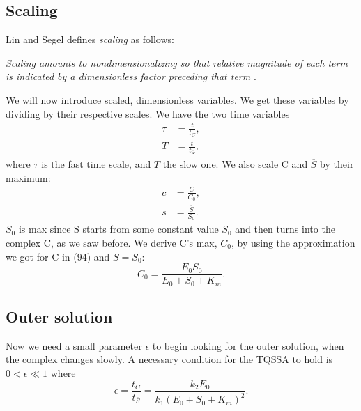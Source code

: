 \documentclass[12pt]{article}
\begin{document}
\subsection{Scaling}

Lin and Segel defines \textit{scaling} as follows:

\textit{Scaling amounts to nondimensionalizing so that relative magnitude of
each term is indicated by a dimensionless factor preceding that term}
\cite{lin1974mathematics}.

We will now introduce scaled, dimensionless variables. We get these
variables by dividing by their respective scales. We have the two time
variables
\begin{align}
\tau &= \frac{t}{t_C}, \\
T &= \frac{t}{t_{\overline{S}}},
\end{align}
where $\tau$ is the fast time scale, and $T$ the slow one. We also
scale C and $\overline{S}$ by their maximum:
\begin{align}
c &= \frac{C}{C_0}, \\
s &= \frac{\overline{S}}{S_0}.
\end{align}
$S_0$ is max since S starts from some constant value $S_0$ and then
turns into the complex C, as we saw before. We derive C's max, $C_0$,
by using the approximation we got for C in (94) and $S=S_0$:
\begin{equation}
C_0 = \frac{E_0 S_0}{E_0 + S_0 + K_m}.
\end{equation}

\subsection{Outer solution}

Now we need a small parameter $\epsilon$ to begin looking for the
outer solution, when the complex changes slowly. A necessary condition
for the TQSSA to hold is $0 < \epsilon \ll 1$ where
\begin{equation}
\epsilon = \frac{t_C}{t_{\overline{S}}} = \frac{k_2 E_0}{k_1(E_0+S_0+K_m)^2}.
\end{equation}
\end{document}
